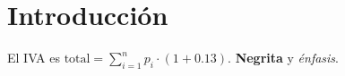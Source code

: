 \documentclass{article}
\begin{document}
\section{Introducción}
El IVA es $\text{total} = \sum_{i=1}^{n} p_i \cdot (1 + 0.13)$.
\textbf{Negrita} y \emph{énfasis}.
\end{document}
